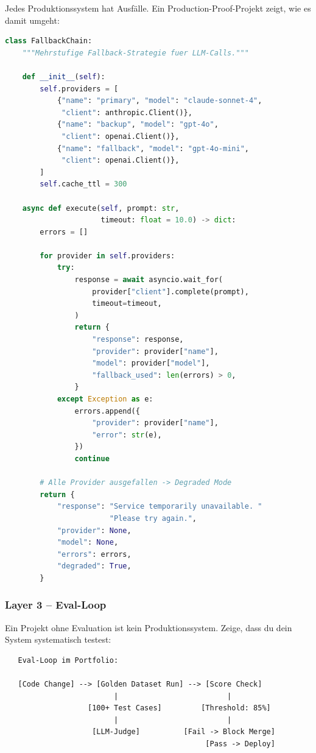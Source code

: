 Jedes Produktionssystem hat Ausfälle. Ein Production-Proof-Projekt zeigt, wie es damit umgeht:

\begin{lstlisting}[language=Python, caption=Fallback-Chain für LLM-Produktionssystem]
class FallbackChain:
    """Mehrstufige Fallback-Strategie fuer LLM-Calls."""

    def __init__(self):
        self.providers = [
            {"name": "primary", "model": "claude-sonnet-4",
             "client": anthropic.Client()},
            {"name": "backup", "model": "gpt-4o",
             "client": openai.Client()},
            {"name": "fallback", "model": "gpt-4o-mini",
             "client": openai.Client()},
        ]
        self.cache_ttl = 300

    async def execute(self, prompt: str,
                      timeout: float = 10.0) -> dict:
        errors = []

        for provider in self.providers:
            try:
                response = await asyncio.wait_for(
                    provider["client"].complete(prompt),
                    timeout=timeout,
                )
                return {
                    "response": response,
                    "provider": provider["name"],
                    "model": provider["model"],
                    "fallback_used": len(errors) > 0,
                }
            except Exception as e:
                errors.append({
                    "provider": provider["name"],
                    "error": str(e),
                })
                continue

        # Alle Provider ausgefallen -> Degraded Mode
        return {
            "response": "Service temporarily unavailable. "
                        "Please try again.",
            "provider": None,
            "model": None,
            "errors": errors,
            "degraded": True,
        }
\end{lstlisting}

\subsubsection{Layer 3 -- Eval-Loop}

Ein Projekt ohne Evaluation ist kein Produktionssystem. Zeige, dass du dein System systematisch testest:

\begin{verbatim}
   Eval-Loop im Portfolio:

   [Code Change] --> [Golden Dataset Run] --> [Score Check]
                         |                         |
                   [100+ Test Cases]         [Threshold: 85%]
                         |                         |
                    [LLM-Judge]          [Fail -> Block Merge]
                                              [Pass -> Deploy]
\end{verbatim}

